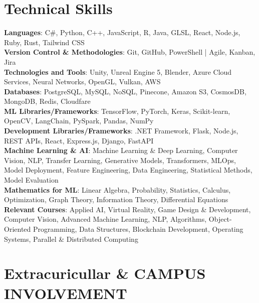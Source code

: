 \section{Technical Skills}
\textbf{Languages}: C\#, Python, C++, JavaScript, R, Java, GLSL, React, Node.js, Ruby, Rust, Tailwind CSS \\
\noindent\textbf{Version Control \& Methodologies}: Git, GitHub, PowerShell |  Agile, Kanban, Jira \\
\noindent\textbf{Technologies and Tools}: Unity, Unreal Engine 5, Blender, Azure Cloud Services, Neural Networks, OpenGL, Vulkan, AWS \\
\noindent\textbf{Databases}: PostgreSQL, MySQL, NoSQL, Pinecone, Amazon S3, CosmosDB, MongoDB, Redis, Cloudfare \\
\noindent\textbf{ML Libraries/Frameworks}: TensorFlow, PyTorch, Keras, Scikit-learn, OpenCV, LangChain, PySpark, Pandas, NumPy \\
\noindent\textbf{Development Libraries/Frameworks}: .NET Framework, Flask, Node.js, REST APIs, React, Express.js, Django, FastAPI \\
\noindent\textbf{Machine Learning \& AI}: Machine Learning \& Deep Learning, Computer Vision, NLP, Transfer Learning, Generative Models, Transformers, MLOps, Model Deployment, Feature Engineering, Data Engineering, Statistical Methods, Model Evaluation \\
\noindent\textbf{Mathematics for ML}: Linear Algebra, Probability, Statistics, Calculus, Optimization, Graph Theory, Information Theory, Differential Equations \\
\noindent\textbf{Relevant Courses}: Applied AI, Virtual Reality, Game Design \& Development, Computer Vision, Advanced Machine Learning, NLP, Algorithms, Object-Oriented Programming, Data Structures, Blockchain Development, Operating Systems, Parallel \& Distributed Computing 


\section{Extracuricullar \& CAMPUS INVOLVEMENT}
